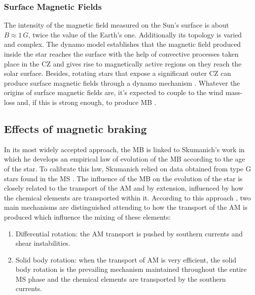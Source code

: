 \documentclass[fleqn,usenatbib]{mnras}
\begin{document}
\subsubsection{Surface Magnetic Fields} \label{surf_mf}
The intensity of the magnetic field measured on the Sun's surface is about $B\approx1\, G$, twice the value of the Earth's one. Additionally its topology is varied and complex. The dynamo model establishes that the magnetic field produced inside the star reaches the surface with the help of convective processes taken place in the CZ and gives rise to magnetically active regions on they reach the solar surface. Besides, rotating stars that expose a significant outer CZ can produce surface magnetic fields through a dynamo mechanism \citep[e.g.][]{Brandenburg2004,Charbonneau2010,Brun2017}. Whatever the origins of surface magnetic fields are, it's expected to couple to the wind mass-loss and, if this is strong enough, to produce MB \citep[e.g.][]{UdDoula2002,Ud-Doula2007,Ud-Doula2008,Meynet2010}.\par

\subsection{Effects of magnetic braking}
In its most widely accepted approach, the MB is linked to Skumanich's work in which he develops an empirical law of evolution of the MB according to the age of the star. To calibrate this law, Skumanich relied on data obtained from type G stars found in the MS \citep{Skumanich1972}. The influence of the MB on the evolution of the star is closely related to the transport of the AM and by extension, influenced by how the chemical elements are transported within it. According to this approach \citep{Meynet2010}, two main mechanisms are distinguished attending to how the transport of the AM is produced which influence the mixing of these elements:

\begin{enumerate}
    \item Differential rotation: the AM transport is pushed by southern currents and shear instabilities.
    \item Solid body rotation: when the transport of AM is very efficient, the solid body rotation is the prevailing mechanism maintained throughout the entire MS phase and the chemical elements are transported by the southern currents.
\end{enumerate}
\end{document}
